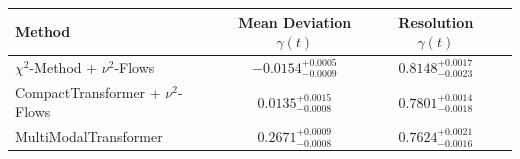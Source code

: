     \begin{tabular}{lccc}
        \toprule
        Method & Mean Deviation $\gamma(t)$ & Resolution $\gamma(t)$ \\
        \midrule
        $\chi^2$-Method + $\nu^2$-Flows & $-0.0154^{+0.0005}_{-0.0009}$ & $0.8148^{+0.0017}_{-0.0023}$ \\
        CompactTransformer + $\nu^2$-Flows & $0.0135^{+0.0015}_{-0.0008}$ & $0.7801^{+0.0014}_{-0.0018}$ \\
        MultiModalTransformer & $0.2671^{+0.0009}_{-0.0008}$ & $0.7624^{+0.0021}_{-0.0016}$ \\
        \bottomrule
    \end{tabular}